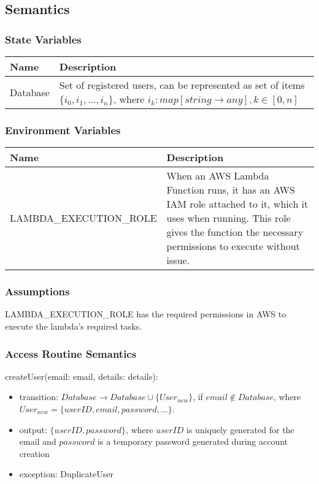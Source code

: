 \documentclass[12pt, titlepage]{article}
\begin{document}
\subsection{Semantics}

\subsubsection{State Variables}
\begin{center}
  \begin{tabular}{p{4cm} p{12cm}}
    \hline
    \textbf{Name} & \textbf{Description} \\
    \hline
    Database & Set of registered users, can be represented as set of
    items $\{i_0, i_1, ..., i_n\}$, where $i_k:
    map[string \rightarrow  any], k\in[0,n]$ \\
    \hline
  \end{tabular}
\end{center}

\subsubsection{Environment Variables}

\begin{center}
  \begin{tabular}{p{6cm} p{10cm}}
    \hline
    \textbf{Name} & \textbf{Description} \\
    \hline
    LAMBDA\_EXECUTION\_ROLE & When an AWS Lambda Function runs, it
    has an AWS IAM role attached to it, which it uses when running.
    This role gives the function the necessary permissions to execute
    without issue. \\
    \hline
  \end{tabular}
\end{center}

\subsubsection{Assumptions}

LAMBDA\_EXECUTION\_ROLE has the required permissions in AWS to
execute the lambda's required tasks.

\subsubsection{Access Routine Semantics}

\noindent createUser(email: email, details: details):
\begin{itemize}
  \item transition: $Database \rightarrow Database \cup
    \{User_{new}\}$, if $email \notin Database$, where $User_{new} =
    \{userID, email, password, \ldots\}$.
  \item output: $\{userID, password\}$, where $userID$ is uniquely
    generated for the email and $password$ is a temporary password
    generated during account creation
  \item exception: DuplicateUser
\end{itemize}
\end{document}
